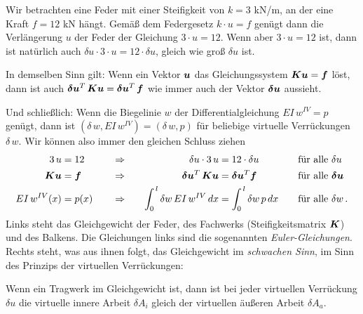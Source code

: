 Wir betrachten eine Feder mit einer Steifigkeit von $k = 3$ kN/m, an der eine Kraft $f = 12$ kN h\"{a}ngt. Gem\"{a}{\ss} dem Federgesetz $k \cdot u = f$ gen\"{u}gt dann die
Verl\"{a}ngerung $u$ der Feder der Gleichung $3 \cdot u = 12$. Wenn aber $3 \cdot u = 12$ ist, dann ist nat\"{u}rlich auch $\delta u \cdot 3\cdot u = 12 \cdot \delta u$, gleich wie gro{\ss} $\delta u$ ist.

In demselben Sinn gilt: Wenn ein Vektor $\mbox{\boldmath $u$}$ das Gleichungssystem $\mbox{\boldmath $K$} \mbox{\boldmath $u$} = \mbox{\boldmath $f$}$ l\"{o}st, dann ist
auch $\mbox{\boldmath $\delta$} \mbox{\boldmath $u$}^T\,\mbox{\boldmath $K$}\mbox{\boldmath $u$} = \mbox{\boldmath $\delta$} \mbox{\boldmath $u$}^T\,\mbox{\boldmath $f$}$ wie immer auch der
Vektor $\mbox{\boldmath $\delta$} \mbox{\boldmath $u$}$ aussieht.

Und schlie{\ss}lich: Wenn die Biegelinie $w$ der Differentialgleichung
$EI\,w^{IV} = p$ gen\"{u}gt, dann ist $(\delta\,w,EI\,w^{IV}) = (\delta \,w,p)$ f\"{u}r
beliebige virtuelle Verr\"{u}ckungen $\delta\,w$. Wir k\"{o}nnen also immer den gleichen Schluss ziehen
\begin{alignat}{4}
3\,u &= 12  &&\quad\Rightarrow \quad &\delta u \cdot 3\, u &= 12 \cdot \delta u & &\quad \mbox{f\"{u}r alle $\delta u$}\nonumber \\
\mbox{\boldmath $K$} \mbox{\boldmath $u$} &= \mbox{\boldmath $f$}  &&\quad\Rightarrow \quad &\mbox{\boldmath $\delta$} \mbox{\boldmath $u$}^T \,\mbox{\boldmath $K$} \mbox{\boldmath $u$} &= \mbox{\boldmath $\delta$} \mbox{\boldmath $u$}^T \mbox{\boldmath $f$} & &\quad \mbox{f\"{u}r alle $\mbox{\boldmath $\delta$} \mbox{\boldmath $u$}$}\nonumber \\
EI\,w^{IV}(x) &= p(x) &&\quad\Rightarrow \quad &\int_0^{\,l} \delta w\,EI\,w^{IV}\,dx &=
\int_0^{\,l} \delta w\,p\,dx & &\quad \mbox{f\"{u}r alle $\delta w$}\,. \nonumber \label{A12DEZ2}
\end{alignat}
Links steht das Gleichgewicht der Feder, des Fachwerks (Steifigkeitsmatrix $\mbox{\boldmath $K$}$) und des Balkens. Die Gleichungen links sind die sogenannten {\em Euler-Gleichungen\/}. Rechts steht, was aus ihnen folgt, das Gleichgewicht im {\em schwachen Sinn\/}, im Sinn des Prinzips der virtuellen Verr\"{u}ckungen:\\

\hspace*{-12pt}\colorbox{highlightBlue}{\parbox{0.98\textwidth}{ Wenn ein Tragwerk im Gleichgewicht ist, dann ist bei jeder virtuellen Verr\"{u}ckung $\delta u$ die virtuelle innere Arbeit $\delta A_i$ gleich der virtuellen \"{a}u{\ss}eren Arbeit
$\delta A_a$.}}\\

